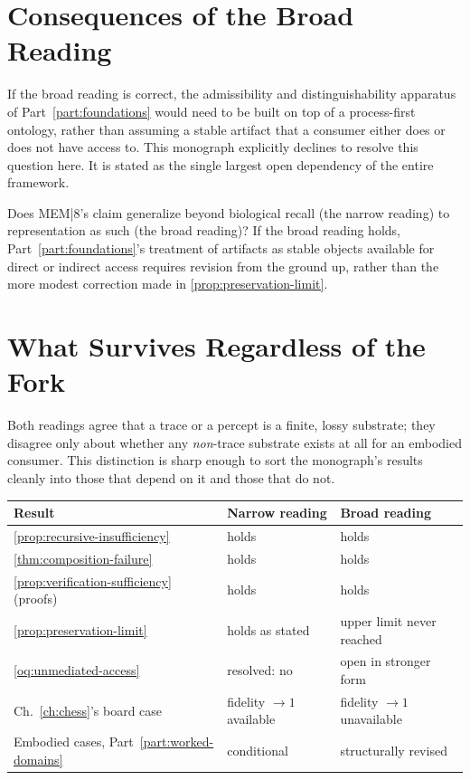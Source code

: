 \section{Consequences of the Broad Reading}

If the broad reading is correct, the admissibility and distinguishability
apparatus of Part~\ref{part:foundations} would need to be built on top of
a process-first ontology, rather than assuming a stable artifact that a
consumer either does or does not have access to. This monograph
explicitly declines to resolve this question here. It is stated as the
single largest open dependency of the entire framework.

\begin{openquestion}
\label{oq:mem8-fork}
Does MEM|8's claim generalize beyond biological recall (the narrow
reading) to representation as such (the broad reading)? If the broad
reading holds, Part~\ref{part:foundations}'s treatment of artifacts as
stable objects available for direct or indirect access requires revision
from the ground up, rather than the more modest correction made in
\cref{prop:preservation-limit}.
\end{openquestion}

\section{What Survives Regardless of the Fork}

Both readings agree that a trace or a percept is a finite, lossy
substrate; they disagree only about whether any \emph{non}-trace
substrate exists at all for an embodied consumer. This distinction is
sharp enough to sort the monograph's results cleanly into those that
depend on it and those that do not.

\begin{center}
\small
\begin{tabular}{p{4.3cm}p{2.3cm}p{2.3cm}}
\toprule
Result & Narrow reading & Broad reading \\
\midrule
\cref{prop:recursive-insufficiency} & holds & holds \\
\cref{thm:composition-failure} & holds & holds \\
\cref{prop:verification-sufficiency} (proofs) & holds & holds \\
\cref{prop:preservation-limit} & holds as stated & upper limit never reached \\
\cref{oq:unmediated-access} & resolved: no & open in stronger form \\
Ch.~\ref{ch:chess}'s board case & fidelity $\to 1$ available & fidelity $\to 1$ unavailable \\
Embodied cases, Part~\ref{part:worked-domains} & conditional & structurally revised \\
\bottomrule
\end{tabular}
\end{center}

